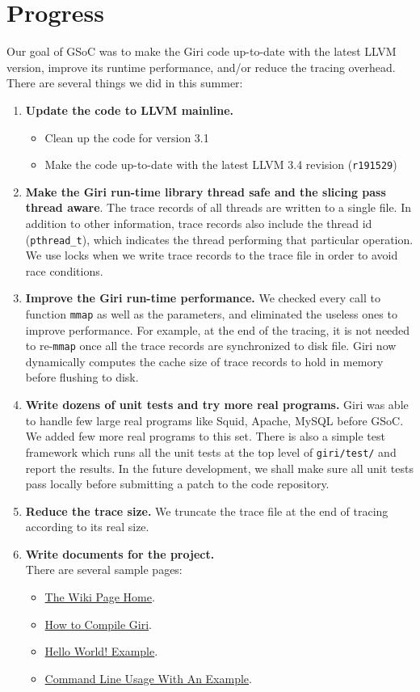 \documentclass[DIV=calc, paper=a4, fontsize=11pt, twocolumn]{scrartcl}
\begin{document}
\section{Progress}
\label{sec:progress}
Our goal of GSoC was to make the Giri code up-to-date with the latest LLVM version, improve its runtime performance, and/or reduce the tracing overhead.
There are several things we did in this summer:
\begin{enumerate}
	\item \textbf{Update the code to LLVM mainline.}
		\begin{itemize}
			\item Clean up the code for version 3.1
			\item Make the code up-to-date with the latest LLVM 3.4 revision (\texttt{r191529})
		\end{itemize}
	\item \textbf{Make the Giri run-time library thread safe and the slicing pass thread aware}.
		The trace records of all threads are written to a single file.
		In addition to other information, trace records also include the thread id (\texttt{pthread\_t}),
		which indicates the thread performing that particular operation.
		We use locks when we write trace records to the trace file in order to avoid race conditions.
	\item \textbf{Improve the Giri run-time performance.}
		We checked every call to function \texttt{mmap} as well as the parameters, and eliminated the useless ones to improve performance.
		For example, at the end of the tracing, it is not needed to re-\texttt{mmap} once all the trace records are synchronized to disk file.
		Giri now dynamically computes the cache size of trace records to hold in memory before flushing to disk.
	\item \textbf{Write dozens of unit tests and try more real programs.}
		Giri was able to handle few large real programs like Squid, Apache, MySQL before GSoC.
		We added few more real programs to this set.
		There is also a simple test framework which runs all the unit tests at the top level of \texttt{giri/test/} and report the results.
		In the future development, we shall make sure all unit tests pass locally before submitting a patch to the code repository.
	\item \textbf{Reduce the trace size.}
		We truncate the trace file at the end of tracing according to its real size.
	\item \textbf{Write documents for the project.}\\
		There are several sample pages:
		\begin{itemize}
			\item \href{https://github.com/liuml07/giri/wiki}{The Wiki Page Home}.
			\item \href{https://github.com/liuml07/giri/wiki/How-to-Compile-Giri}{How to Compile Giri}.
			\item \href{https://github.com/liuml07/giri/wiki/Hello-World}{Hello World! Example}.
			\item \href{https://github.com/liuml07/giri/wiki/Example-Usage}{Command Line Usage With An Example}.
		\end{itemize}
\end{enumerate}
\end{document}
